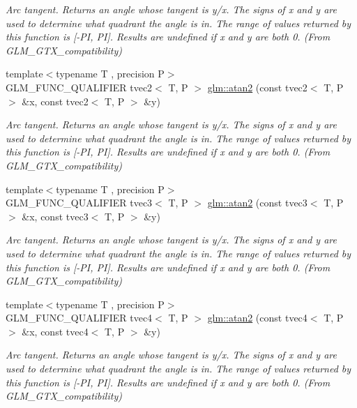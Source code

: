\begin{DoxyCompactItemize}
\begin{DoxyCompactList}\small\item\em Arc tangent. Returns an angle whose tangent is y/x. The signs of x and y are used to determine what quadrant the angle is in. The range of values returned by this function is \mbox{[}-\/\+P\+I, P\+I\mbox{]}. Results are undefined if x and y are both 0. (From G\+L\+M\+\_\+\+G\+T\+X\+\_\+compatibility) \end{DoxyCompactList}\item 
{\footnotesize template$<$typename T , precision P$>$ }\\G\+L\+M\+\_\+\+F\+U\+N\+C\+\_\+\+Q\+U\+A\+L\+I\+F\+I\+E\+R tvec2$<$ T, P $>$ \hyperlink{group__gtx__compatibility_ga525f3e849d0fc64807f8ab571b4545f9}{glm\+::atan2} (const tvec2$<$ T, P $>$ \&x, const tvec2$<$ T, P $>$ \&y)
\begin{DoxyCompactList}\small\item\em Arc tangent. Returns an angle whose tangent is y/x. The signs of x and y are used to determine what quadrant the angle is in. The range of values returned by this function is \mbox{[}-\/\+P\+I, P\+I\mbox{]}. Results are undefined if x and y are both 0. (From G\+L\+M\+\_\+\+G\+T\+X\+\_\+compatibility) \end{DoxyCompactList}\item 
{\footnotesize template$<$typename T , precision P$>$ }\\G\+L\+M\+\_\+\+F\+U\+N\+C\+\_\+\+Q\+U\+A\+L\+I\+F\+I\+E\+R tvec3$<$ T, P $>$ \hyperlink{group__gtx__compatibility_gad328042b6734d3f2c49c0ec1328b14c0}{glm\+::atan2} (const tvec3$<$ T, P $>$ \&x, const tvec3$<$ T, P $>$ \&y)
\begin{DoxyCompactList}\small\item\em Arc tangent. Returns an angle whose tangent is y/x. The signs of x and y are used to determine what quadrant the angle is in. The range of values returned by this function is \mbox{[}-\/\+P\+I, P\+I\mbox{]}. Results are undefined if x and y are both 0. (From G\+L\+M\+\_\+\+G\+T\+X\+\_\+compatibility) \end{DoxyCompactList}\item 
{\footnotesize template$<$typename T , precision P$>$ }\\G\+L\+M\+\_\+\+F\+U\+N\+C\+\_\+\+Q\+U\+A\+L\+I\+F\+I\+E\+R tvec4$<$ T, P $>$ \hyperlink{group__gtx__compatibility_ga09d39c391a509a045b6c7061f15bdff5}{glm\+::atan2} (const tvec4$<$ T, P $>$ \&x, const tvec4$<$ T, P $>$ \&y)
\begin{DoxyCompactList}\small\item\em Arc tangent. Returns an angle whose tangent is y/x. The signs of x and y are used to determine what quadrant the angle is in. The range of values returned by this function is \mbox{[}-\/\+P\+I, P\+I\mbox{]}. Results are undefined if x and y are both 0. (From G\+L\+M\+\_\+\+G\+T\+X\+\_\+compatibility) \end{DoxyCompactList}\item 

\end{DoxyCompactItemize}
